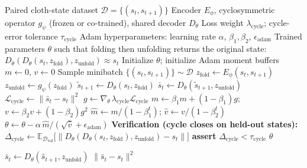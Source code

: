 \documentclass[11pt]{article}
\begin{document}
\begin{algorithm}[H]
\caption{Cycle Consistency Learning (Standalone Pretraining)}
\label{alg:cycle-consistency}
\begin{algorithmic}[1]
\Require Paired cloth-state dataset $\mathcal{D} = \{(s_t, s_{t+1})\}$
\Require Encoder $E_\phi$, cyclosymmetric operator $g_\psi$ (frozen or co-trained), shared decoder $D_\theta$
\Require Loss weight $\lambda_{\text{cycle}}$; cycle-error tolerance $\tau_{\text{cycle}}$
\Require Adam hyperparameters: learning rate $\alpha$, $\beta_1, \beta_2$, $\epsilon_{\text{adam}}$
\Ensure Trained parameters $\theta$ such that folding then unfolding returns the original state: $D_\theta(D_\theta(s_t, z_{\text{fold}}), z_{\text{unfold}}) \approx s_t$
\State Initialize $\theta$; initialize Adam moment buffers $m \gets 0$, $v \gets 0$
    \State Sample minibatch $\{(s_t, s_{t+1})\} \sim \mathcal{D}$
    \State $z_{\text{fold}} \gets E_\phi(s_t, s_{t+1})$ 
    \State $z_{\text{unfold}} \gets g_\psi(z_{\text{fold}})$ 
    \State $\tilde{s}_{t+1} \gets D_\theta(s_t, z_{\text{fold}})$ 
    \State $\bar{s}_t \gets D_\theta(\tilde{s}_{t+1}, z_{\text{unfold}})$ 
    \State $\mathcal{L}_{\text{cycle}} \gets \lVert \bar{s}_t - s_t \rVert^2$
    \State $g \gets \nabla_{\theta}\,\lambda_{\text{cycle}}\mathcal{L}_{\text{cycle}}$
    \State $m \gets \beta_1 m + (1-\beta_1) g$; \quad $v \gets \beta_2 v + (1-\beta_2) g^2$
    \State $\hat{m} \gets m / (1-\beta_1^{t})$; \quad $\hat{v} \gets v / (1-\beta_2^{t})$
    \State $\theta \gets \theta - \alpha\, \hat{m} / (\sqrt{\hat{v}} + \epsilon_{\text{adam}})$
\EndWhile
\State \textbf{Verification (cycle closes on held-out states):}
\State \hspace{1em} $\Delta_{\text{cycle}} \gets \mathbb{E}_{\mathcal{D}_{\text{val}}}\big[\lVert D_\theta(D_\theta(s_t, z_{\text{fold}}), z_{\text{unfold}}) - s_t \rVert\big]$
\State \hspace{1em} \textbf{assert} $\Delta_{\text{cycle}} < \tau_{\text{cycle}}$
\State \Return $\theta$
\end{algorithmic}
\end{algorithm}

\begin{algorithm}[H]
\caption{\textsc{CycleConsistencyLoss} Subroutine (de-duplicated; called from Algorithm~\ref{alg:blam-stage1-final})}
\label{alg:cycle-sub-v2}
\begin{algorithmic}[1]
    \State $\bar{s}_t \gets D_\theta(\hat{s}_{t+1}, z_{\text{unfold}})$ 
    \State \Return $\lVert \bar{s}_t - s_t \rVert^2$
\EndFunction
\end{algorithmic}
\end{algorithm}
\end{document}
